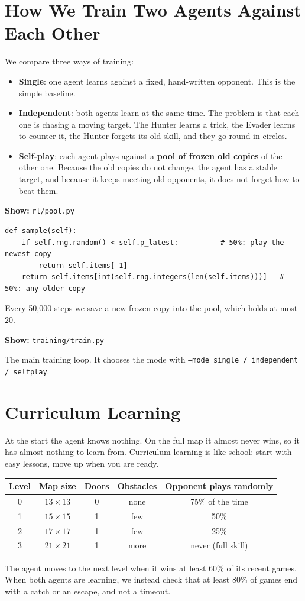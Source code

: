 \documentclass[11pt,a4paper]{article}
\newcommand{\code}[1]{\texttt{#1}}
\newcommand{\showfile}[1]{\par\noindent\textbf{Show:} \code{#1}\par}
\begin{document}
\section{How We Train Two Agents Against Each Other}
We compare three ways of training:
\begin{itemize}
  \item \textbf{Single}: one agent learns against a fixed, hand-written opponent. This is the
        simple baseline.
  \item \textbf{Independent}: both agents learn at the same time. The problem is that each one is
        chasing a moving target. The Hunter learns a trick, the Evader learns to counter it, the
        Hunter forgets its old skill, and they go round in circles.
  \item \textbf{Self-play}: each agent plays against a \textbf{pool of frozen old copies} of the
        other one. Because the old copies do not change, the agent has a stable target, and
        because it keeps meeting old opponents, it does not forget how to beat them.
\end{itemize}

\showfile{rl/pool.py}
\begin{lstlisting}
def sample(self):
    if self.rng.random() < self.p_latest:          # 50%: play the newest copy
        return self.items[-1]
    return self.items[int(self.rng.integers(len(self.items)))]   # 50%: any older copy
\end{lstlisting}
Every 50{,}000 steps we save a new frozen copy into the pool, which holds at most 20.

\showfile{training/train.py}
The main training loop. It chooses the mode with \code{--mode single / independent / selfplay}.

\section{Curriculum Learning}
At the start the agent knows nothing. On the full map it almost never wins, so it has almost
nothing to learn from. Curriculum learning is like school: start with easy lessons, move up when
you are ready.

\begin{center}
\begin{tabular}{ccccc}
\toprule
Level & Map size & Doors & Obstacles & Opponent plays randomly\\
\midrule
0 & $13\times13$ & 0 & none & 75\% of the time\\
1 & $15\times15$ & 1 & few  & 50\%\\
2 & $17\times17$ & 1 & few  & 25\%\\
3 & $21\times21$ & 1 & more & never (full skill)\\
\bottomrule
\end{tabular}
\end{center}
The agent moves to the next level when it wins at least 60\% of its recent games. When both agents
are learning, we instead check that at least 80\% of games end with a catch or an escape, and not
a timeout.
\end{document}
